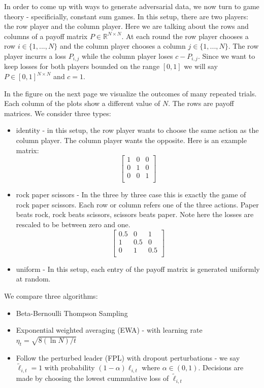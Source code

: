 \documentclass[10pt,a4paper]{article} %
\begin{document}
	In order to come up with ways to generate adversarial data, we now turn to game theory - specificially, constant sum games.  In this setup, there are two players: the row player and the column player.  Here we are talking about the rows and columns of a payoff matrix $P \in \mathds{R}^{N \times N}$.  At each round the row player chooses a row $i \in \{1, ..., N\}$ and the column player chooses a column $j \in \{1, ..., N\}$.  The row player incurrs a loss $P_{i, j}$ while the column player loses $c - P_{i, j}$.  Since we want to keep losses for both players bounded on the range $\left[ 0, 1 \right] $ we will say $P \in \left[ 0, 1 \right] ^{N \times N}$ and $c = 1$.
		
	In the figure on the next page we visualize the outcomes of many repeated trials.  Each column of the plots show a different value of $N$.  The rows are payoff matrices.  We consider three types: 
	\begin{itemize}
		\item identity - in this setup, the row player wants to choose the same action as the column player.  The column player wants the opposite.  Here is an example matrix:
		$$
		\begin{bmatrix}
			1  &  0 & 0     \\
			0  &  1 & 0     \\
			0  &  0 & 1     \\
		\end{bmatrix}
		$$
		\item rock paper scissors - In the three by three case this is exactly the game of rock paper scissors.  Each row or column refers one of the three actions.  Paper beats rock, rock beats scissors, scissors beats paper.  Note here the losses are rescaled to be between zero and one.
		$$
		\begin{bmatrix}
			0.5  &  0 & 1     \\
			1  &  0.5 & 0     \\
			0  &  1  & 0.5    \\
		\end{bmatrix}
		$$
		\item uniform - In this setup, each entry of the payoff matrix is generated uniformly at random.
	\end{itemize}
	We compare three algorithms: 
	\begin{itemize}
		\item Beta-Bernoulli Thompson Sampling
		\item Exponential weighted averaging (EWA) - with learning rate $\eta_t = \sqrt{8 (\ln{N})/t}$
		\item Follow the perturbed leader (FPL) with dropout perturbations -  we say $\widetilde{\ell}_{i, t} = 1$ with probability $(1 - \alpha) \ell_{i, t}$ where $\alpha \in (0, 1)$.  Decisions are made by choosing the lowest cummulative loss of $\widetilde{\ell}_{i, t}$
	\end{itemize}
\end{document}
